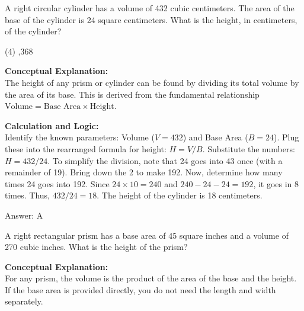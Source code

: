 \documentclass[11pt,paper=a4,answers]{exam}
\begin{document}
\begin{questions}
\vspace{60pt}

\question
A right circular cylinder has a volume of 432 cubic centimeters. The area of the base of the cylinder is 24 square centimeters. What is the height, in centimeters, of the cylinder?
\begin{tasks}(4)
    ,368
\end{tasks}

\begin{solution}
\textbf{Conceptual Explanation:} \\
The height of any prism or cylinder can be found by dividing its total volume by the area of its base. This is derived from the fundamental relationship $\text{Volume} = \text{Base Area} \times \text{Height}$.

\vspace{30pt}

\textbf{Calculation and Logic:} \\
Identify the known parameters: Volume ($V = 432$) and Base Area ($B = 24$). Plug these into the rearranged formula for height: $H = V / B$. Substitute the numbers: $H = 432 / 24$. To simplify the division, note that 24 goes into 43 once (with a remainder of 19). Bring down the 2 to make 192. Now, determine how many times 24 goes into 192. Since $24 \times 10 = 240$ and $240 - 24 - 24 = 192$, it goes in 8 times. Thus, $432 / 24 = 18$. The height of the cylinder is 18 centimeters.

\vspace{30pt}

Answer: \colorbox{yellow!100}{A}
\end{solution}

\vspace{60pt}

\question
A right rectangular prism has a base area of 45 square inches and a volume of 270 cubic inches. What is the height of the prism?

\begin{solution}
\textbf{Conceptual Explanation:} \\
For any prism, the volume is the product of the area of the base and the height. If the base area is provided directly, you do not need the length and width separately.

\vspace{30pt}


\end{solution}
\end{questions}
\end{document}
